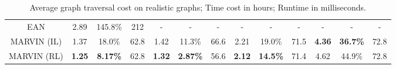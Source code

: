 \begin{table*}[t]
\begin{center}
{\begin{tabular}{c|ccc|ccc|ccc|ccc}
      EAN         & 2.89          & 145.8\%         & 212              & -              & -               & -                   & -             & -               & -             & -             & -               & -                \\
      MARVIN (IL) & 1.37          & 18.0\%          & 62.8             & 1.42           & 11.3\%          & 66.6                & 2.21          & 19.0\%          & 71.5          & \textbf{4.36} & \textbf{36.7\%} & 72.8 \\
      MARVIN (RL) & \textbf{1.25} & \textbf{8.17\%} & 62.8             & \textbf{1.32}  & \textbf{2.87\%} & 56.6                & \textbf{2.12} & \textbf{14.5\%} & 71.4          & 4.62          & 44.9\%          & 72.8 \\
      \bottomrule
      \end{tabular}%
      }
      \caption{Average graph traversal cost on realistic graphs; Time cost in hours; Runtime in milliseconds.}
        \label{tab:1}
        \vspace{-0.2in}
        \end{center}
    \end{table*}
